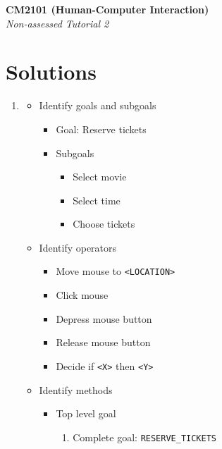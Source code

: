\documentclass[11pt,a4paper]{report}
\begin{document}
\noindent\Large\textbf{CM2101 (Human-Computer Interaction)}\\
\noindent\large\textit{Non-assessed Tutorial 2}
\vskip30pt

\section*{Solutions}

\begin{enumerate}

    \item   
        \begin{itemize}
            \item Identify goals and subgoals
                \begin{itemize}
                    \item Goal: Reserve tickets
                    \item Subgoals
                    \begin{itemize}
                        \item Select movie
                        \item Select time
                        \item Choose tickets
                    \end{itemize}
                \end{itemize}
                \item Identify operators
                    \begin{itemize}
                        \item Move mouse to \texttt{<LOCATION>}
                        \item Click mouse
                        \item Depress mouse button
                        \item Release mouse button
                        \item Decide if \texttt{<X>} then \texttt{<Y>}
                    \end{itemize}
                \item Identify methods
                    \begin{itemize}
                        \item Top level goal
                            \begin{enumerate}
                                \item Complete goal: \texttt{RESERVE\_TICKETS}
                            \end{enumerate}

\end{itemize}
\end{itemize}
\end{enumerate}
\end{document}
